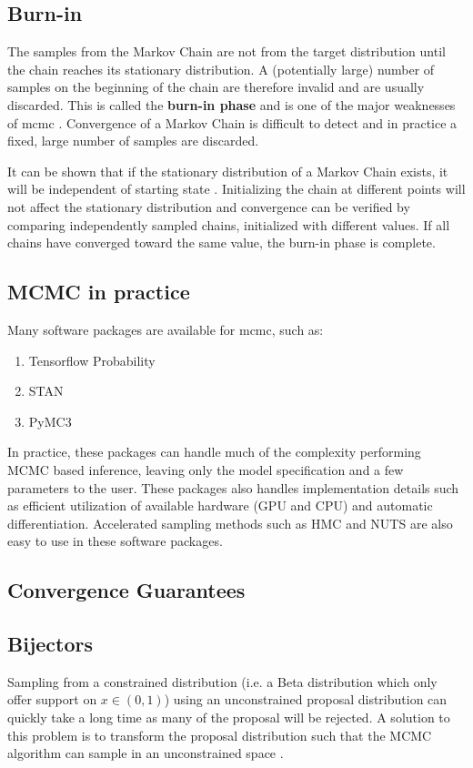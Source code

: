 \subsection{Burn-in}
The samples from the Markov Chain are not from the target distribution until the chain reaches its stationary distribution. A (potentially large) number of samples on the beginning of the chain are therefore invalid and are usually discarded. This is called the \textbf{burn-in phase} and is one of the major weaknesses of \acrshort{mcmc} \cite{murphy}. Convergence of a Markov Chain is difficult to detect and in practice a fixed, large number of samples are discarded.   

It can be shown that if the stationary distribution of a Markov Chain exists, it will be independent of starting state \cite{murphy}. Initializing the chain at different points will not affect the stationary distribution and convergence can be verified by comparing independently sampled chains, initialized with different values. If all chains have converged toward the same value, the burn-in phase is complete.    

\subsection{MCMC in practice}
Many software packages are available for \acrshort{mcmc}, such as: 

\begin{enumerate}
    \item Tensorflow Probability \cite{tensorflow2015-whitepaper}
    \item STAN \cite{stan}
    \item PyMC3 \cite{pymc3}
\end{enumerate}

In practice, these packages can handle much of the complexity performing MCMC based inference, leaving only the model specification and a few parameters to the user. These packages also handles implementation details such as efficient utilization of available hardware (GPU and CPU) and automatic differentiation. Accelerated sampling methods such as HMC and NUTS are also easy to use in these software packages.   

\subsection{Convergence Guarantees}

\subsection{Bijectors}
Sampling from a constrained distribution (i.e. a Beta distribution which only offer support on $x \in (0, 1)$) using an unconstrained proposal distribution can quickly take a long time as many of the proposal will be rejected. A solution to this problem is to transform the proposal distribution such that the MCMC algorithm can sample in an unconstrained space \cite{Parno_2018, tensorflow2015-whitepaper}. 

